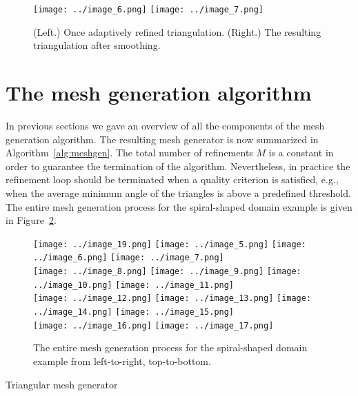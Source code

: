 \documentclass[11pt]{article}
\begin{document}
\begin{figure}[htbp]
\centering
\texttt{[image: ../image\_6.png]}
\texttt{[image: ../image\_7.png]}
\caption{(Left.) Once adaptively refined triangulation. (Right.) The resulting
  triangulation after smoothing.}
\label{fig:firstsmooth}
\end{figure}

\section{The mesh generation algorithm}
\label{sec:orgff9b6c1}

In previous sections we gave an overview of all the components of the mesh
generation algorithm.  The resulting mesh generator is now summarized in
Algorithm~\ref{alg:meshgen}.  The total number of refinements $M$ is a constant
in order to guarantee the termination of the algorithm.  Nevertheless, in practice
the refinement loop should be terminated when a quality criterion is
satisfied, e.g., when the average minimum angle of the triangles
is above a predefined threshold.
The entire mesh generation process for the spiral-shaped domain
example is given in Figure~\ref{fig:spiralexample}.


\begin{figure}[htbp]
  \centering
  \texttt{[image: ../image\_19.png]}
  \texttt{[image: ../image\_5.png]}
  \texttt{[image: ../image\_6.png]}
  \texttt{[image: ../image\_7.png]}\\
  \texttt{[image: ../image\_8.png]}
  \texttt{[image: ../image\_9.png]}
  \texttt{[image: ../image\_10.png]}
  \texttt{[image: ../image\_11.png]}\\
  \texttt{[image: ../image\_12.png]}
  \texttt{[image: ../image\_13.png]}
  \texttt{[image: ../image\_14.png]}
  \texttt{[image: ../image\_15.png]}\\
  \texttt{[image: ../image\_16.png]}
  \texttt{[image: ../image\_17.png]}
  \caption{The entire mesh generation process for the spiral-shaped domain
    example from left-to-right, top-to-bottom.}
\label{fig:spiralexample}
\end{figure}


\begin{algorithm}[H]
  \caption{Triangular mesh generator}
  \label{alg:meshgen}
  \begin{algorithmic}[1]
    \Statex
    \EndFor
    \State {}
    \EndFunction
  \end{algorithmic}
\end{algorithm}
\end{document}
